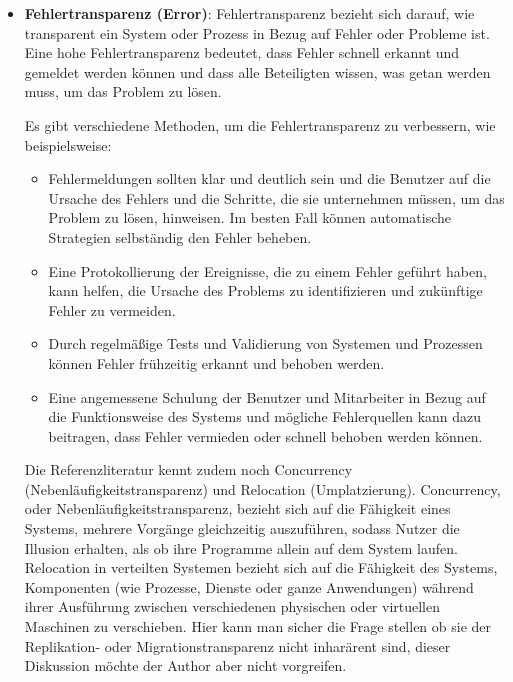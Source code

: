 \documentclass[../vs-script-first-v01.tex]{subfiles}
\begin{document}
\begin{itemize}
\item \textbf{Fehlertransparenz (Error)}: Fehlertransparenz bezieht sich darauf, wie transparent ein System oder Prozess in Bezug auf Fehler oder Probleme ist. Eine hohe Fehlertransparenz bedeutet, dass Fehler schnell erkannt und gemeldet werden können und dass alle Beteiligten wissen, was getan werden muss, um das Problem zu lösen.

Es gibt verschiedene Methoden, um die Fehlertransparenz zu verbessern, wie beispielsweise:
\begin{itemize}
\item Fehlermeldungen sollten klar und deutlich sein und die Benutzer auf die Ursache des Fehlers und die Schritte, die sie unternehmen müssen, um das Problem zu lösen, hinweisen. Im besten Fall können automatische Strategien selbständig den Fehler beheben.

\item Eine Protokollierung der Ereignisse, die zu einem Fehler geführt haben, kann helfen, die Ursache des Problems zu identifizieren und zukünftige Fehler zu vermeiden.

\item Durch regelmäßige Tests und Validierung von Systemen und Prozessen können Fehler frühzeitig erkannt und behoben werden.

\item Eine angemessene Schulung der Benutzer und Mitarbeiter in Bezug auf die Funktionsweise des Systems und mögliche Fehlerquellen kann dazu beitragen, dass Fehler vermieden oder schnell behoben werden können.
\end{itemize}
Die Referenzliteratur kennt zudem noch Concurrency (Nebenläufigkeitstransparenz) und Relocation (Umplatzierung). Concurrency, oder Nebenläufigkeitstransparenz, bezieht sich auf die Fähigkeit eines Systems, mehrere Vorgänge gleichzeitig auszuführen, sodass Nutzer die Illusion erhalten, als ob ihre Programme allein auf dem System laufen. Relocation in verteilten Systemen bezieht sich auf die Fähigkeit des Systems, Komponenten (wie Prozesse, Dienste oder ganze Anwendungen) während ihrer Ausführung zwischen verschiedenen physischen oder virtuellen Maschinen zu verschieben. Hier kann man sicher die Frage stellen ob sie der Replikation- oder Migrationstransparenz nicht inharärent sind, dieser Diskussion möchte der Author aber nicht vorgreifen. 


\end{itemize}
\end{document}
